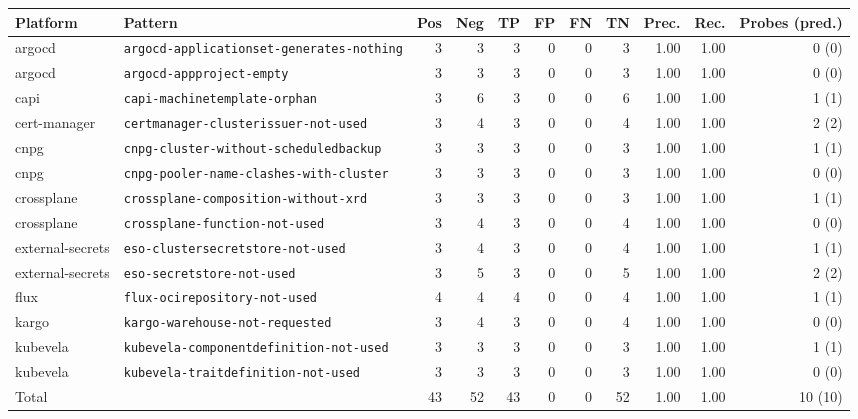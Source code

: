 \begin{tabular}{llrrrrrrrrr}
\toprule
Platform & Pattern & Pos & Neg & TP & FP & FN & TN & Prec. & Rec. & Probes (pred.) \\
\midrule
argocd & \texttt{argocd-applicationset-generates-nothing} & 3 & 3 & 3 & 0 & 0 & 3 & 1.00 & 1.00 & 0 (0) \\
argocd & \texttt{argocd-appproject-empty} & 3 & 3 & 3 & 0 & 0 & 3 & 1.00 & 1.00 & 0 (0) \\
capi & \texttt{capi-machinetemplate-orphan} & 3 & 6 & 3 & 0 & 0 & 6 & 1.00 & 1.00 & 1 (1) \\
cert-manager & \texttt{certmanager-clusterissuer-not-used} & 3 & 4 & 3 & 0 & 0 & 4 & 1.00 & 1.00 & 2 (2) \\
cnpg & \texttt{cnpg-cluster-without-scheduledbackup} & 3 & 3 & 3 & 0 & 0 & 3 & 1.00 & 1.00 & 1 (1) \\
cnpg & \texttt{cnpg-pooler-name-clashes-with-cluster} & 3 & 3 & 3 & 0 & 0 & 3 & 1.00 & 1.00 & 0 (0) \\
crossplane & \texttt{crossplane-composition-without-xrd} & 3 & 3 & 3 & 0 & 0 & 3 & 1.00 & 1.00 & 1 (1) \\
crossplane & \texttt{crossplane-function-not-used} & 3 & 4 & 3 & 0 & 0 & 4 & 1.00 & 1.00 & 0 (0) \\
external-secrets & \texttt{eso-clustersecretstore-not-used} & 3 & 4 & 3 & 0 & 0 & 4 & 1.00 & 1.00 & 1 (1) \\
external-secrets & \texttt{eso-secretstore-not-used} & 3 & 5 & 3 & 0 & 0 & 5 & 1.00 & 1.00 & 2 (2) \\
flux & \texttt{flux-ocirepository-not-used} & 4 & 4 & 4 & 0 & 0 & 4 & 1.00 & 1.00 & 1 (1) \\
kargo & \texttt{kargo-warehouse-not-requested} & 3 & 4 & 3 & 0 & 0 & 4 & 1.00 & 1.00 & 0 (0) \\
kubevela & \texttt{kubevela-componentdefinition-not-used} & 3 & 3 & 3 & 0 & 0 & 3 & 1.00 & 1.00 & 1 (1) \\
kubevela & \texttt{kubevela-traitdefinition-not-used} & 3 & 3 & 3 & 0 & 0 & 3 & 1.00 & 1.00 & 0 (0) \\
\midrule
\multicolumn{2}{l}{Total} & 43 & 52 & 43 & 0 & 0 & 52 & 1.00 & 1.00 & 10 (10) \\
\bottomrule
\end{tabular}
